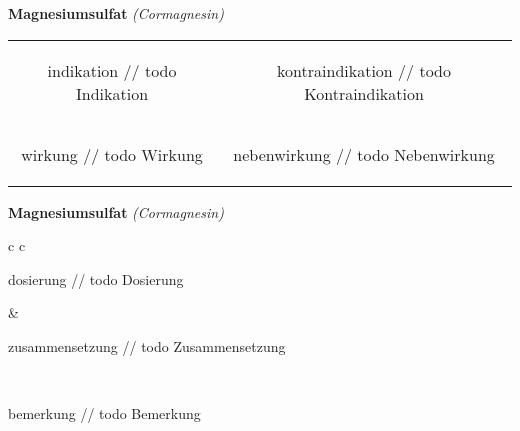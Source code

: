 \documentclass[12pt]{beamer}
\begin{document}
\begin{frame}{
    \textbf{Magnesiumsulfat}
    \textit{(Cormagnesin)}
}
    \begin{tabular}{c c}
        \begin{beamercolorbox}[wd=\boxwidth\textwidth,ht=\boxheight\textheight,sep=1em]{indikation}
        // todo Indikation
        \end{beamercolorbox} & 
        \begin{beamercolorbox}[wd=\boxwidth\textwidth,ht=\boxheight\textheight,sep=1em]{kontraindikation}
        // todo Kontraindikation 
        \end{beamercolorbox} \\
        \begin{beamercolorbox}[wd=\boxwidth\textwidth,ht=\boxheight\textheight,sep=1em]{wirkung}
        // todo Wirkung
        \end{beamercolorbox} & 
        \begin{beamercolorbox}[wd=\boxwidth\textwidth,ht=\boxheight\textheight,sep=1em]{nebenwirkung}
        // todo Nebenwirkung
        \end{beamercolorbox} \\
    \end{tabular}
\end{frame}

\begin{frame}{
    \textbf{Magnesiumsulfat}
    \textit{(Cormagnesin)}
}
    \begin{tabular}{c c}
        \begin{beamercolorbox}[wd=\boxwidth\textwidth,ht=\boxheight\textheight,sep=1em]{dosierung}
        // todo Dosierung
        \end{beamercolorbox} & 
        \begin{beamercolorbox}[wd=\boxwidth\textwidth,ht=\boxheight\textheight,sep=1em]{zusammensetzung}
        // todo Zusammensetzung
        \end{beamercolorbox} \\
        \begin{beamercolorbox}[wd=\textwidth,ht=\boxheight\textheight,sep=1em]{bemerkung}
        // todo Bemerkung
        \end{beamercolorbox} \\
    \end{tabular}
\end{frame}
\end{document}
